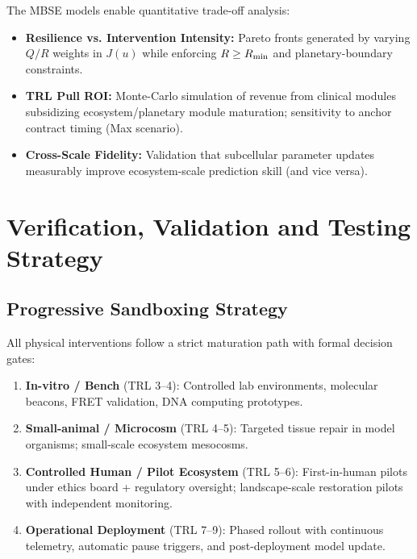 \documentclass[11pt,a4paper]{report}
\begin{document}
The MBSE models enable quantitative trade-off analysis:

\begin{itemize}
    \item \textbf{Resilience vs. Intervention Intensity:} Pareto fronts generated by varying $Q/R$ weights in $J(u)$ while enforcing $R \geq R_{\rm min}$ and planetary-boundary constraints.
    \item \textbf{TRL Pull ROI:} Monte-Carlo simulation of revenue from clinical modules subsidizing ecosystem/planetary module maturation; sensitivity to anchor contract timing (Max scenario).
    \item \textbf{Cross-Scale Fidelity:} Validation that subcellular parameter updates measurably improve ecosystem-scale prediction skill (and vice versa).
\end{itemize}

\chapter{Verification, Validation and Testing Strategy}

\section{Progressive Sandboxing Strategy}

All physical interventions follow a strict maturation path with formal decision gates:

\begin{enumerate}
    \item \textbf{In-vitro / Bench} (TRL 3--4): Controlled lab environments, molecular beacons, FRET validation, DNA computing prototypes.
    \item \textbf{Small-animal / Microcosm} (TRL 4--5): Targeted tissue repair in model organisms; small-scale ecosystem mesocosms.
    \item \textbf{Controlled Human / Pilot Ecosystem} (TRL 5--6): First-in-human pilots under ethics board + regulatory oversight; landscape-scale restoration pilots with independent monitoring.
    \item \textbf{Operational Deployment} (TRL 7--9): Phased rollout with continuous telemetry, automatic pause triggers, and post-deployment model update.
\end{enumerate}
\end{document}
